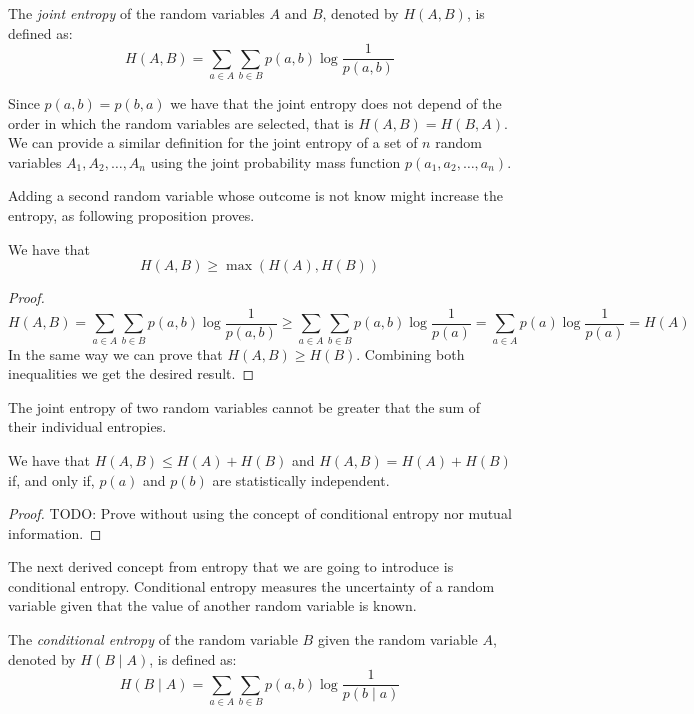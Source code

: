 \begin{definition}
The \emph{joint entropy} of the random variables $A$ and $B$, denoted by $H(A, B)$, is defined as:
\[
H(A, B) = \sum_{a \in A} \sum_{b \in B} p(a, b) \log \frac{1}{p(a, b)}
\]
\end{definition}

Since $p(a, b) = p(b, a)$ we have that the joint entropy does not depend of the order in which the random variables are selected, that is $H(A, B) = H(B, A)$. We can provide a similar definition for the joint entropy of a set of $n$ random variables $A_1, A_2, \ldots, A_n$ using the joint probability mass function $p(a_1, a_2, \ldots, a_n)$.

Adding a second random variable whose outcome is not know might increase the entropy, as following proposition proves.

\begin{proposition}
We have that
\[
H(A, B) \geq \max \left( H(A), H(B) \right)
\]
\end{proposition}
\begin{proof}
\[
H(A, B) = \sum_{a \in A} \sum_{b \in B} p(a,b) \log \frac{1}{p(a,b)} \geq \sum_{a \in A} \sum_{b \in B} p(a,b) \log \frac{1}{p(a)} = \sum_{a \in A} p(a) \log \frac{1}{p(a)} = H(A)
\]
In the same way we can prove that $H(A, B) \geq H(B)$. Combining both inequalities we get the desired result.
\end{proof}

The joint entropy of two random variables cannot be greater that the sum of their individual entropies.

\begin{proposition}
\label{prop:joint_entropy}
We have that $H(A, B) \leq H(A) + H(B)$ and $H(A, B) = H(A) + H(B)$ if, and only if, $p(a)$ and $p(b)$ are statistically independent.
\end{proposition}
\begin{proof}
{\color{red} TODO: Prove without using the concept of conditional entropy nor mutual information.}
\end{proof}


The next derived concept from entropy that we are going to introduce is conditional entropy. Conditional entropy measures the uncertainty of a random variable given that the value of another random variable is known.

\begin{definition}
The \emph{conditional entropy} of the random variable $B$ given the random variable $A$, denoted by $H(B \mid A)$, is defined as:
\[
H(B \mid A) = \sum_{a \in A} \sum_{b \in B} p(a, b) \log \frac{1}{p(b \mid a)}
\]
\end{definition}

